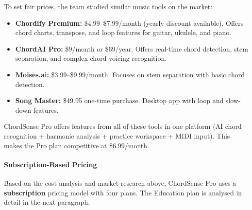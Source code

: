 \documentclass[a4paper]{article}
\begin{document}
To set fair prices, the team studied similar music tools on the market:

\begin{itemize}
    \item \textbf{Chordify Premium:} \$4.99--\$7.99/month (yearly discount available). Offers chord charts, transpose, and loop features for guitar, ukulele, and piano.
    \item \textbf{ChordAI Pro:} \$9/month or \$69/year. Offers real-time chord detection, stem separation, and complex chord voicing recognition.
    \item \textbf{Moises.ai:} \$3.99--\$9.99/month. Focuses on stem separation with basic chord detection.
    \item \textbf{Song Master:} \$49.95 one-time purchase. Desktop app with loop and slow-down features.
\end{itemize}

ChordSense Pro offers features from all of these tools in one platform (AI chord recognition + harmonic analysis + practice workspace + MIDI input). This makes the Pro plan competitive at \$6.99/month.

\paragraph{Subscription-Based Pricing}

Based on the cost analysis and market research above, ChordSense Pro uses a \textbf{subscription} pricing model with four plans. The Education plan is analysed in detail in the next paragraph.
\end{document}
